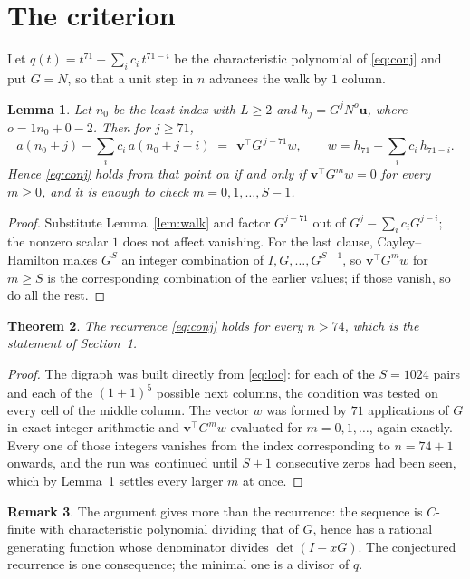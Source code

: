 \documentclass[11pt,a4paper]{article}
\theoremstyle{plain}
\newtheorem{theorem}{Theorem}
\newtheorem{lemma}[theorem]{Lemma}
\theoremstyle{definition}
\newtheorem{remark}[theorem]{Remark}
\begin{document}
\section{The criterion}

Let $q(t)=t^{71}-\sum_i c_i\,t^{71-i}$ be the characteristic polynomial of
\eqref{eq:conj} and put $G=N$, so that a unit step in $n$ advances the walk by
$1$ column.

\begin{lemma}\label{lem:crit}
Let $n_0$ be the least index with $L\ge2$ and $h_j=G^{j}N^{o}\mathbf{u}$, where
$o=1n_0+0-2$. Then for $j\ge71$,
\[
a(n_0+j)-\sum_i c_i\,a(n_0+j-i)\;=\;\,\mathbf{v}^{\!\top}G^{\,j-71}w,
\qquad w=h_{71}-\sum_i c_i\,h_{71-i} .
\]
Hence \eqref{eq:conj} holds from that point on if and only if
$\mathbf{v}^{\!\top}G^{m}w=0$ for every $m\ge0$, and it is enough to check
$m=0,1,\dots,S-1$.
\end{lemma}

\begin{proof}
Substitute Lemma~\ref{lem:walk} and factor $G^{j-71}$ out of
$G^{j}-\sum_ic_iG^{j-i}$; the nonzero scalar $1$ does not affect
vanishing. For the last clause, Cayley--Hamilton makes $G^{S}$ an integer combination of
$I,G,\dots,G^{S-1}$, so $\mathbf{v}^{\!\top}G^{m}w$ for $m\ge S$ is the corresponding
combination of the earlier values; if those vanish, so do all the rest.
\end{proof}

\begin{theorem}
The recurrence \eqref{eq:conj} holds for every $n>74$, which is the statement of
Section~1.
\end{theorem}

\begin{proof}
The digraph was built directly from \eqref{eq:loc}: for each of the $S=1024$ pairs and each
of the $(1+1)^{5}$ possible next columns, the condition was tested on every cell of
the middle column. The vector $w$ was formed by $71$ applications of $G$ in exact integer
arithmetic and $\mathbf{v}^{\!\top}G^{m}w$ evaluated for $m=0,1,\dots$, again exactly.
Every one of those integers vanishes from the index corresponding to $n=74+1$ onwards,
and the run was continued until $S+1$ consecutive zeros had been seen, which by
Lemma~\ref{lem:crit} settles every larger $m$ at once.
\end{proof}

\begin{remark}
The argument gives more than the recurrence: the sequence is $C$-finite with characteristic
polynomial dividing that of $G$, hence has a rational generating function whose denominator
divides $\det(I-xG)$. The conjectured recurrence is one consequence; the minimal one is a
divisor of $q$.
\end{remark}
\end{document}
